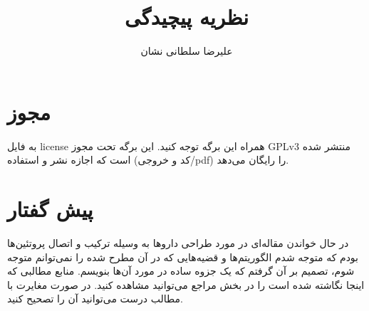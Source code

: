 \documentclass[a4paper]{article}
\title{نظریه پیچیدگی}
\author{علیرضا سلطانی نشان}
\begin{document}
\maketitle

\section{مجوز}

به فایل license همراه این برگه توجه کنید. این برگه تحت مجوز GPLv3 منتشر شده است
که اجازه نشر و استفاده (کد و خروجی/pdf) را رایگان می‌دهد.

\section{پیش گفتار}

در حال خواندن مقاله‌ای در مورد طراحی دارو‌ها به وسیله ترکیب و اتصال پروتئین‌ها
بودم که متوجه شدم الگوریتم‌ها و قضیه‌هایی که در آن مطرح شده را نمی‌توانم متوجه
شوم، تصمیم بر آن گرفتم که یک جزوه ساده در مورد آن‌ها بنویسم. منابع مطالبی که
اینجا نگاشته شده است را در بخش مراجع می‌توانید مشاهده کنید. در صورت مغایرت با
مطالب درست می‌توانید آن را تصحیح کنید.
\end{document}
